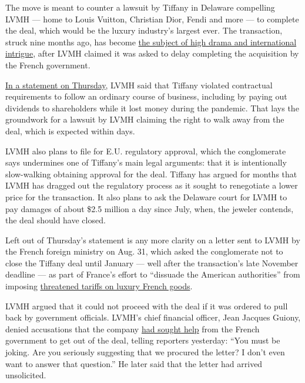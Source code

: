 The move is meant to counter a lawsuit by Tiffany in Delaware compelling
LVMH --- home to Louis Vuitton, Christian Dior, Fendi and more --- to
complete the deal, which would be the luxury industry's largest ever.
The transaction, struck nine months ago, has become
\href{https://www.nytimes3xbfgragh.onion/2020/09/09/business/lvmh-tiffany-deal-lawsuit.html}{the
subject of high drama and international intrigue}, after LVMH claimed it
was asked to delay completing the acquisition by the French government.

\href{https://www.lvmh.com/news-documents/press-releases/lvmh-intends-to-file-a-lawsuit-against-tiffany-as-a-result-of-crisis-mismanagement/}{In
a statement on Thursday}, LVMH said that Tiffany violated contractual
requirements to follow an ordinary course of business, including by
paying out dividends to shareholders while it lost money during the
pandemic. That lays the groundwork for a lawsuit by LVMH claiming the
right to walk away from the deal, which is expected within days.

LVMH also plans to file for E.U. regulatory approval, which the
conglomerate says undermines one of Tiffany's main legal arguments: that
it is intentionally slow-walking obtaining approval for the deal.
Tiffany has argued for months that LVMH has dragged out the regulatory
process as it sought to renegotiate a lower price for the transaction.
It also plans to ask the Delaware court for LVMH to pay damages of about
\$2.5 million a day since July, when, the jeweler contends, the deal
should have closed.

Left out of Thursday's statement is any more clarity on a letter sent to
LVMH by the French foreign ministry on Aug. 31, which asked the
conglomerate not to close the Tiffany deal until January --- well after
the transaction's late November deadline --- as part of France's effort
to ``dissuade the American authorities'' from imposing
\href{https://www.nytimes3xbfgragh.onion/2020/07/10/business/us-will-impose-tariffs-on-french-goods-in-response-to-tech-tax.html}{threatened
tariffs on luxury French goods}.

LVMH argued that it could not proceed with the deal if it was ordered to
pull back by government officials. LVMH's chief financial officer, Jean
Jacques Guiony, denied accusations that the company
\href{https://www.bloomberg.com/news/articles/2020-09-09/lvmh-s-arnault-leaned-on-french-government-to-exit-tiffany-deal}{had
sought help} from the French government to get out of the deal, telling
reporters yesterday: ``You must be joking. Are you seriously suggesting
that we procured the letter? I don't even want to answer that
question.'' He later said that the letter had arrived unsolicited.

